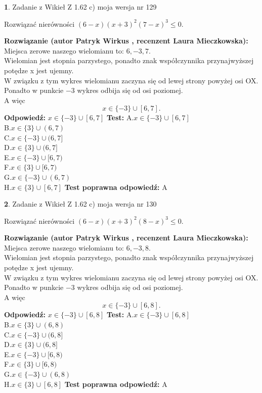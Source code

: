 \documentclass[12pt, a4paper]{article}
\theoremstyle{definition} %
\newtheorem{zad}{}
\newcommand{\zadStart}[1]{\begin{zad}#1\newline}
\newcommand{\zadStop}{\end{zad}}
\newcommand{\rozwStart}[2]{\noindent \textbf{Rozwiązanie (autor #1 , recenzent #2): }\newline}
\newcommand{\rozwStop}{\newline}
\newcommand{\odpStart}{\noindent \textbf{Odpowiedź:}\newline}
\newcommand{\odpStop}{\newline}
\newcommand{\testStart}{\noindent \textbf{Test:}\newline}
\newcommand{\testStop}{\newline}
\newcommand{\kluczStart}{\noindent \textbf{Test poprawna odpowiedź:}\newline}
\newcommand{\kluczStop}{\newline}
\begin{document}
\zadStart{Zadanie z Wikieł Z 1.62 c) moja wersja nr 129}

Rozwiązać nierówności $(6-x)(x+3)^{2}(7-x)^{3}\le0$.
\zadStop
\rozwStart{Patryk Wirkus}{Laura Mieczkowska}
Miejsca zerowe naszego wielomianu to: $6, -3, 7$.\\
Wielomian jest stopnia parzystego, ponadto znak współczynnika przy\linebreak najwyższej potędze x jest ujemny.\\ W związku z tym wykres wielomianu zaczyna się od lewej strony powyżej osi OX.\\
Ponadto w punkcie $-3$ wykres odbija się od osi poziomej.\\
A więc $$x \in \{-3\} \cup [6,7].$$
\rozwStop
\odpStart
$x \in \{-3\} \cup [6,7]$
\odpStop
\testStart
A.$x \in \{-3\} \cup [6,7]$\\
B.$x \in \{3\} \cup (6,7)$\\
C.$x \in \{-3\} \cup (6,7]$\\
D.$x \in \{3\} \cup (6,7]$\\
E.$x \in \{-3\} \cup [6,7)$\\
F.$x \in \{3\} \cup [6,7)$\\
G.$x \in \{-3\} \cup (6,7)$\\
H.$x \in \{3\} \cup [6,7]$
\testStop
\kluczStart
A
\kluczStop



\zadStart{Zadanie z Wikieł Z 1.62 c) moja wersja nr 130}

Rozwiązać nierówności $(6-x)(x+3)^{2}(8-x)^{3}\le0$.
\zadStop
\rozwStart{Patryk Wirkus}{Laura Mieczkowska}
Miejsca zerowe naszego wielomianu to: $6, -3, 8$.\\
Wielomian jest stopnia parzystego, ponadto znak współczynnika przy\linebreak najwyższej potędze x jest ujemny.\\ W związku z tym wykres wielomianu zaczyna się od lewej strony powyżej osi OX.\\
Ponadto w punkcie $-3$ wykres odbija się od osi poziomej.\\
A więc $$x \in \{-3\} \cup [6,8].$$
\rozwStop
\odpStart
$x \in \{-3\} \cup [6,8]$
\odpStop
\testStart
A.$x \in \{-3\} \cup [6,8]$\\
B.$x \in \{3\} \cup (6,8)$\\
C.$x \in \{-3\} \cup (6,8]$\\
D.$x \in \{3\} \cup (6,8]$\\
E.$x \in \{-3\} \cup [6,8)$\\
F.$x \in \{3\} \cup [6,8)$\\
G.$x \in \{-3\} \cup (6,8)$\\
H.$x \in \{3\} \cup [6,8]$
\testStop
\kluczStart
A
\kluczStop
\end{document}

